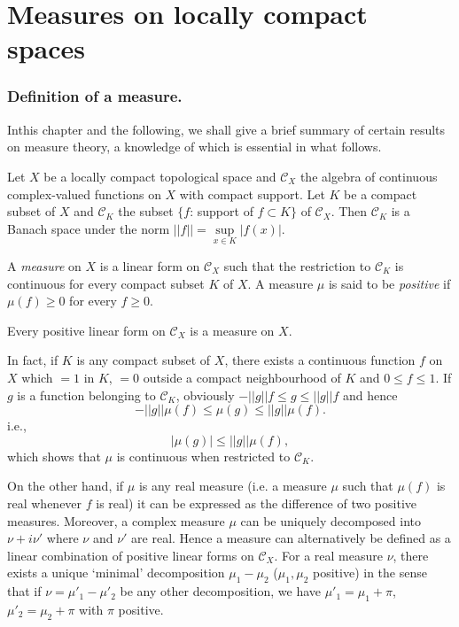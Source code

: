 \chapter{Measures on locally compact spaces}\label{partII-chap1}

\setcounter{section}{1}
\setcounter{subsection}{0}
\subsection{Definition of a
measure.}\label{partII-chap1-sec1.1}%

In\pageoriginale this chapter and the following, we shall give a brief summary of
certain results on measure theory, a knowledge of which is essential
in what follows. 

Let $X$ be a locally compact topological space and $\mathscr{C}_X$ the
algebra of continuous complex-valued functions on $X$ with compact
support. Let $K$ be a compact subset of $X$ and $\mathscr{C}_K$ the
subset $\{f$: support of $f \subset K\}$ of $\mathscr{C}_X$. Then
$\mathscr{C}_K$ is a Banach  space under the norm $|| f
||= \sup\limits_{x\in K} | f(x)|$.  

\begin{defi*}
 A {\em measure} on $X$ is a linear form on $\mathscr{C}_X$ such that
 the restriction to $\mathscr{C}_K$ is continuous for  every compact
 subset $K$ of $X$. A measure $\mu$  is said to be {\em positive} if
 $\mu(f) \geq 0$ for every $f\geq 0$.  
\end{defi*}

\setcounter{proposition}{0}
\begin{proposition}\label{partII-chap1-prop1}%
Every positive linear form on $\mathscr{C}_X$ is a measure on $X$. 
\end{proposition}

In fact, if $K$ is any compact subset of $X$, there exists a
continuous function $f$ on $X$ which $=1$ in $K$, $=0$ outside a compact
neighbourhood of $K$ and $0 \leq f \leq 1$. If $g$ is a function
belonging to $\mathscr{C}_K$, obviously $-|| g || f \leq g \leq || g ||
f$ and hence  
$$
- || g || \mu (f) \leq \mu (g) \leq || g || \mu (f). 
$$
i.e., 
$$
| \mu (g)| \leq || g || \mu (f), 
$$
which shows that $\mu$ is continuous when restricted to $\mathscr{C}_K$.

On the other hand, if $\mu$ is any real measure (i.e. a measure $\mu$
such that $\mu(f)$ is real whenever $f$ is real) it can be  expressed
as the difference of two positive measures. Moreover, a complex
measure $\mu$ can\pageoriginale 
be uniquely decomposed into $\nu + i \nu'$ where
$\nu$ and $\nu'$ are real.  Hence a measure can alternatively be
defined as a linear combination of positive linear forms on
$\mathscr{C}_X$. For a real measure  $\nu$, there exists a unique
`minimal' decomposition $\mu_1 -  \mu_2$ ($\mu_1,\mu_2$ positive) in
the sense that if $\nu  
=\mu'_1 - \mu'_2$ be any other decomposition, we have
$\mu'_1=\mu_1+\pi$, $\mu'_2=\mu_2+\pi$ with $\pi$ positive. 

